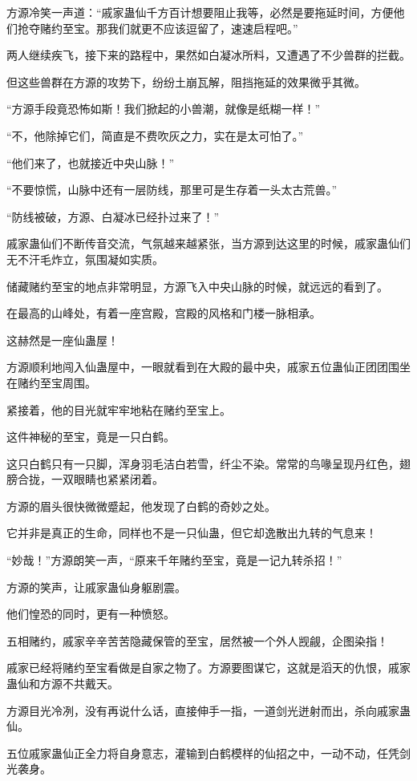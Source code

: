 \begin{this_body}
方源冷笑一声道：“戚家蛊仙千方百计想要阻止我等，必然是要拖延时间，方便他们抢夺赌约至宝。那我们就更不应该逗留了，速速启程吧。”

两人继续疾飞，接下来的路程中，果然如白凝冰所料，又遭遇了不少兽群的拦截。

但这些兽群在方源的攻势下，纷纷土崩瓦解，阻挡拖延的效果微乎其微。

“方源手段竟恐怖如斯！我们掀起的小兽潮，就像是纸糊一样！”

“不，他除掉它们，简直是不费吹灰之力，实在是太可怕了。”

“他们来了，也就接近中央山脉！”

“不要惊慌，山脉中还有一层防线，那里可是生存着一头太古荒兽。”

“防线被破，方源、白凝冰已经扑过来了！”

戚家蛊仙们不断传音交流，气氛越来越紧张，当方源到达这里的时候，戚家蛊仙们无不汗毛炸立，氛围凝如实质。

储藏赌约至宝的地点非常明显，方源飞入中央山脉的时候，就远远的看到了。

在最高的山峰处，有着一座宫殿，宫殿的风格和门楼一脉相承。

这赫然是一座仙蛊屋！

方源顺利地闯入仙蛊屋中，一眼就看到在大殿的最中央，戚家五位蛊仙正团团围坐在赌约至宝周围。

紧接着，他的目光就牢牢地粘在赌约至宝上。

这件神秘的至宝，竟是一只白鹤。

这只白鹤只有一只脚，浑身羽毛洁白若雪，纤尘不染。常常的鸟喙呈现丹红色，翅膀合拢，一双眼睛也紧紧闭着。

方源的眉头很快微微蹙起，他发现了白鹤的奇妙之处。

它并非是真正的生命，同样也不是一只仙蛊，但它却逸散出九转的气息来！

“妙哉！”方源朗笑一声，“原来千年赌约至宝，竟是一记九转杀招！”

方源的笑声，让戚家蛊仙身躯剧震。

他们惶恐的同时，更有一种愤怒。

五相赌约，戚家辛辛苦苦隐藏保管的至宝，居然被一个外人觊觎，企图染指！

戚家已经将赌约至宝看做是自家之物了。方源要图谋它，这就是滔天的仇恨，戚家蛊仙和方源不共戴天。

方源目光冷冽，没有再说什么话，直接伸手一指，一道剑光迸射而出，杀向戚家蛊仙。

五位戚家蛊仙正全力将自身意志，灌输到白鹤模样的仙招之中，一动不动，任凭剑光袭身。


\end{this_body}
